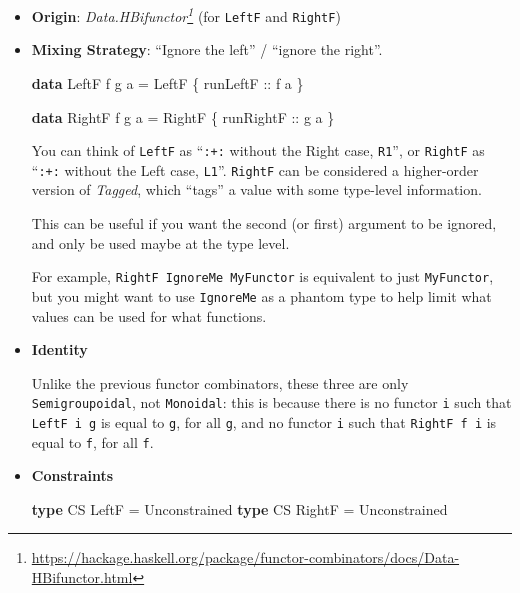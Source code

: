 \documentclass[]{article}
\newenvironment{Shaded}{}{}
\newcommand{\DataTypeTok}[1]{\textcolor[rgb]{0.56,0.13,0.00}{#1}}
\newcommand{\KeywordTok}[1]{\textcolor[rgb]{0.00,0.44,0.13}{\textbf{#1}}}
\newcommand{\NormalTok}[1]{#1}
\newcommand{\OtherTok}[1]{\textcolor[rgb]{0.00,0.44,0.13}{#1}}
\renewcommand{\href}[2]{#2\footnote{\url{#1}}}
\begin{document}
\begin{itemize}
\item
  \textbf{Origin}:
  \emph{\href{https://hackage.haskell.org/package/functor-combinators/docs/Data-HBifunctor.html}{Data.HBifunctor}}
  (for \texttt{LeftF} and \texttt{RightF})
\item
  \textbf{Mixing Strategy}: ``Ignore the left'' / ``ignore the right''.

\begin{Shaded}
\begin{Highlighting}[]
\KeywordTok{data} \DataTypeTok{LeftF}\NormalTok{  f g a }\OtherTok{=} \DataTypeTok{LeftF}\NormalTok{  \{}\OtherTok{ runLeftF  ::}\NormalTok{ f a \}}

\KeywordTok{data} \DataTypeTok{RightF}\NormalTok{ f g a }\OtherTok{=} \DataTypeTok{RightF}\NormalTok{ \{}\OtherTok{ runRightF ::}\NormalTok{ g a \}}
\end{Highlighting}
\end{Shaded}

  You can think of \texttt{LeftF} as ``\texttt{:+:} without the Right case,
  \texttt{R1}'', or \texttt{RightF} as ``\texttt{:+:} without the Left case,
  \texttt{L1}''. \texttt{RightF} can be considered a higher-order version of
  \emph{Tagged}, which ``tags'' a value with some type-level information.

  This can be useful if you want the second (or first) argument to be ignored,
  and only be used maybe at the type level.

  For example, \texttt{RightF\ IgnoreMe\ MyFunctor} is equivalent to just
  \texttt{MyFunctor}, but you might want to use \texttt{IgnoreMe} as a phantom
  type to help limit what values can be used for what functions.
\item
  \textbf{Identity}

  Unlike the previous functor combinators, these three are only
  \texttt{Semigroupoidal}, not \texttt{Monoidal}: this is because there is no
  functor \texttt{i} such that \texttt{LeftF\ i\ g} is equal to \texttt{g}, for
  all \texttt{g}, and no functor \texttt{i} such that \texttt{RightF\ f\ i} is
  equal to \texttt{f}, for all \texttt{f}.
\item
  \textbf{Constraints}

\begin{Shaded}
\begin{Highlighting}[]
\KeywordTok{type} \DataTypeTok{CS} \DataTypeTok{LeftF}  \OtherTok{=} \DataTypeTok{Unconstrained}
\KeywordTok{type} \DataTypeTok{CS} \DataTypeTok{RightF} \OtherTok{=} \DataTypeTok{Unconstrained}
\end{Highlighting}
\end{Shaded}


\end{itemize}
\end{document}
